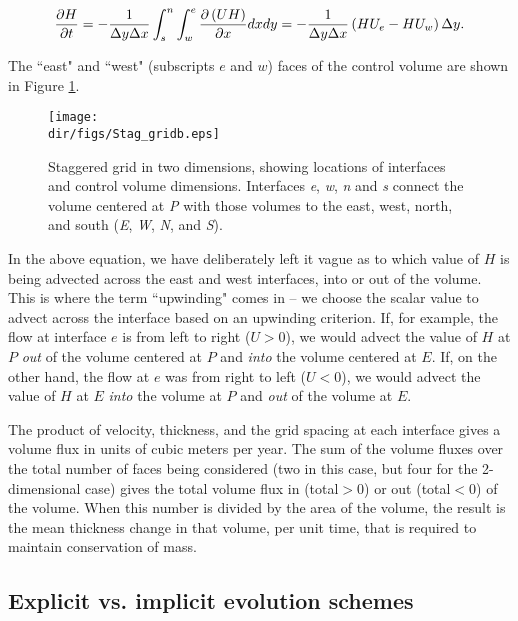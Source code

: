 \begin{equation}
\frac{\partial H}{\partial t}=-\frac{1}{\Delta y\Delta x}\int_{s}^{n}{\int_{w}^{e}{\frac{\partial \left( UH \right)}{\partial x}}}dxdy=-\frac{1}{\Delta y\Delta x}\left( HU_{e}-HU_{w} \right)\Delta y. \\
\end{equation}

\noindent
The ``east" and ``west" (subscripts $e$ and $w$) faces of the control volume are shown in Figure \ref{fig:stag_c_grid2}.

\begin{figure}
  \begin{center}
    \texttt{[image: \\dir/figs/Stag\_gridb.eps]}
  \end{center}
  \caption{Staggered grid in two dimensions, showing locations of interfaces and control volume dimensions. Interfaces \textit{e}, \textit{w}, \textit{n} and \textit{s} connect the volume centered at \textit{P} with those volumes to the east, west, north, and south (\textit{E}, \textit{W}, \textit{N}, and \textit{S}).}
  \label{fig:stag_c_grid2}
\end{figure} 

In the above equation, we have deliberately left it vague as to which value of $H$ is being advected across the east and west interfaces, into or out of the volume. This is where the term ``upwinding" comes in -- we choose the scalar value to advect across the interface based on an upwinding criterion. If, for example, the flow at interface $e$ is from left to right ($U>0$), we would advect the value of $H$ at $P$ \textit{out} of the volume centered at $P$ and \textit{into} the volume centered at $E$. If, on the other hand, the flow at $e$ was from right to left ($U<0$), we would advect the value of $H$ at $E$ \textit{into} the volume at $P$ and \textit{out} of the volume at $E$. 

The product of velocity, thickness, and the grid spacing at each interface gives a volume flux in units of cubic meters per year. The sum of the volume fluxes over the total number of faces being considered (two in this case, but four for the 2-dimensional case) gives the total volume flux in (total$>$0) or out (total$<$0) of the volume. When this number is divided by the area of the volume, the result is the mean thickness change in that volume, per unit time, that is required to maintain conservation of mass.

\subsection{Explicit vs. implicit evolution schemes}

